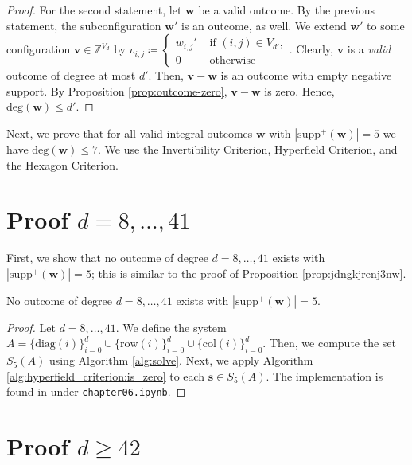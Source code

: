 \begin{proof}
    For the second statement, let \( \mathbf{w} \) be a valid outcome. By the previous statement, the subconfiguration \( \mathbf{w}' \) is an outcome, as well. We extend \( \mathbf{w}' \) to some configuration \( \mathbf{v} \in \mathbb{Z}^{V_d} \) by \( v_{i,j} \coloneqq \begin{cases}
        w_{i,j}' & \text{ if } (i,j) \in V_{d'}, \\
        0 & \text{ otherwise}
    \end{cases} \).
    Clearly, \( \mathbf{v} \) is a \emph{valid} outcome of degree at most \( d' \). Then, \( \mathbf{v} - \mathbf{w} \) is an outcome with empty negative support. By Proposition \ref{prop:outcome-zero}, \(  \mathbf{v} - \mathbf{w} \) is zero. Hence, \( \mathrm{deg}(\mathbf{w}) \leq d' \).
\end{proof}



Next, we prove that for all valid integral outcomes \( \mathbf w \) with \( |\mathrm{supp}^+(\mathbf w)| = 5 \) we have \( \mathrm{deg}(\mathbf w) \leq 7 \). We use the Invertibility Criterion, Hyperfield Criterion, and the Hexagon Criterion.

\section{Proof \( d = 8, \dots, 41 \)}

First, we show that no outcome of degree \( d = 8, \dots, 41 \) exists with \( |\mathrm{supp}^+(\mathbf w)| = 5 \); this is similar to the proof of Proposition \ref{prop:jdngkjrenj3nw}.


\begin{proposition}\label{prop:uiwuwinca}
    No outcome of degree \( d = 8, \dots, 41 \) exists with \( |\mathrm{supp}^+(\mathbf w)| = 5 \).
\end{proposition}

\begin{proof}
    Let \( d = 8, \dots, 41 \). We define the system $A = \{ \mathrm{diag}(i) \}_{i=0}^d \cup \{ \mathrm{row}(i)\}^d_{i=0} \cup \{ \mathrm{col}(i) \}^d_{i=0}$. Then, we compute the set \( S_5(A) \) using Algorithm \ref{alg:solve}. Next, we apply Algorithm \ref{alg:hyperfield_criterion:is_zero} to each \( \mathbf{s} \in S_5(A) \). The implementation is found in \cite{ducrepo} under \texttt{chapter06.ipynb}.
\end{proof}

\section{Proof \( d \geq 42 \)}

